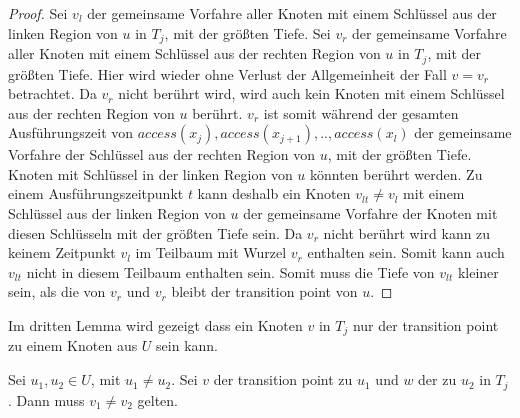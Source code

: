 \documentclass[a4paper,12pt]{article}
\begin{document}
\begin{proof}
	Sei $v_l$ der gemeinsame Vorfahre aller Knoten mit einem Schlüssel aus der linken Region von $u$ in $T_j$, mit der größten Tiefe. Sei $v_r$ der gemeinsame Vorfahre aller Knoten mit einem Schlüssel aus der rechten Region von $u$ in $T_j$, mit der größten Tiefe. Hier wird wieder ohne Verlust der Allgemeinheit der Fall $v = v_r$ betrachtet. Da $v_r$ nicht berührt wird, wird auch kein Knoten mit einem Schlüssel aus der rechten Region von $u$ berührt. $v_r$ ist somit während der gesamten Ausführungszeit von $\textit{access}\left(x_j\right),\textit{access}\left(x_{j+1}\right),..,\textit{access}\left(x_l\right)$  der gemeinsame Vorfahre der Schlüssel aus der rechten Region von $u$, mit der größten Tiefe. Knoten mit Schlüssel in der linken Region von $u$ könnten berührt werden. Zu einem Ausführungszeitpunkt $t$ kann deshalb ein Knoten $v_{lt} \ne v_l$ mit einem Schlüssel aus der linken Region von $u$ der gemeinsame Vorfahre der Knoten mit diesen Schlüsseln mit der größten Tiefe sein. Da $v_r$ nicht berührt wird kann zu keinem Zeitpunkt $v_l$ im Teilbaum mit Wurzel $v_r$ enthalten sein. Somit kann auch $v_{lt}$ nicht in diesem Teilbaum enthalten sein. Somit muss die Tiefe von  $v_{lt}$ kleiner sein, als die von $v_r$ und $v_r$ bleibt der transition point von $u$. 
\end{proof}

\noindent Im dritten Lemma wird gezeigt dass ein Knoten $v$ in $T_j$ nur der transition point zu einem Knoten aus $U$ sein kann.


\begin{Lemma}\label{lemmaDemaine3}
	Sei $u_1, u_2 \in U$, mit $u_1 \ne u_2$.  Sei $v$ der transition point zu $u_1$ und $w$ der zu $u_2$ in $T_j$. Dann muss $v_1 \neq v_2$ gelten.
\end{Lemma}
\end{document}
